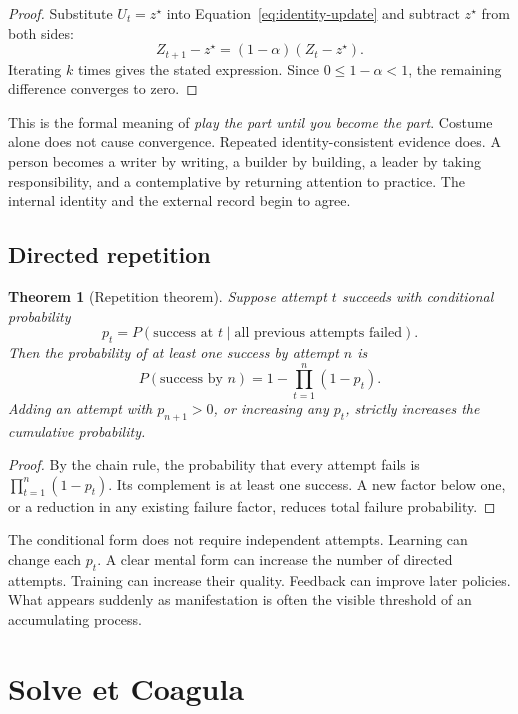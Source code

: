 \documentclass[11pt]{article}
\theoremstyle{plain}
\newtheorem{theorem}{Theorem}[section]
\theoremstyle{definition}
\begin{document}
\begin{proof}
Substitute \(U_t=z^\star\) into Equation~\ref{eq:identity-update} and subtract
\(z^\star\) from both sides:
\[
Z_{t+1}-z^\star=(1-\alpha)(Z_t-z^\star).
\]
Iterating \(k\) times gives the stated expression. Since \(0\leq 1-\alpha<1\), the
remaining difference converges to zero.
\end{proof}

This is the formal meaning of \emph{play the part until you become the part}. Costume
alone does not cause convergence. Repeated identity-consistent evidence does. A person
becomes a writer by writing, a builder by building, a leader by taking responsibility,
and a contemplative by returning attention to practice. The internal identity and the
external record begin to agree.

\subsection*{Directed repetition}

\begin{theorem}[Repetition theorem]
Suppose attempt \(t\) succeeds with conditional probability
\[
p_t=P(\text{success at }t\mid\text{all previous attempts failed}).
\]
Then the probability of at least one success by attempt \(n\) is
\[
P(\text{success by }n)=1-\prod_{t=1}^{n}(1-p_t).
\]
Adding an attempt with \(p_{n+1}>0\), or increasing any \(p_t\), strictly increases
the cumulative probability.
\end{theorem}

\begin{proof}
By the chain rule, the probability that every attempt fails is
\(\prod_{t=1}^{n}(1-p_t)\). Its complement is at least one success. A new factor below
one, or a reduction in any existing failure factor, reduces total failure probability.
\end{proof}

The conditional form does not require independent attempts. Learning can change each
\(p_t\). A clear mental form can increase the number of directed attempts. Training can
increase their quality. Feedback can improve later policies. What appears suddenly as
manifestation is often the visible threshold of an accumulating process.

\section{Solve et Coagula}
\end{document}
